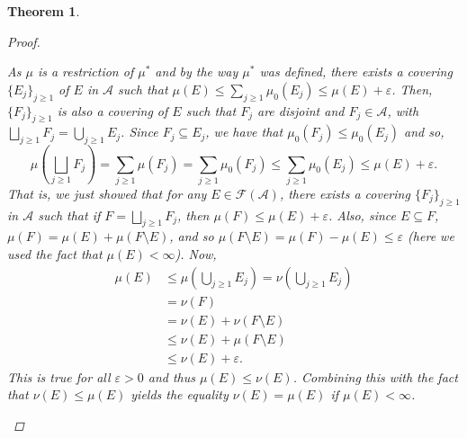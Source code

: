 \documentclass{article}
\newcommand{\A}{\mathscr{A}}
\newcommand{\F}{\mathscr{F}}
\theoremstyle{spaced}
\newtheorem{theorem}{Theorem}[section]
\begin{document}
\begin{theorem}
\begin{proof}
\begin{enumerate}
            As $\mu$ is a restriction of $\mu^*$ and by the way $\mu^*$ was defined, there exists a covering $\{E_j\}_{j \geq 1}$ of $E$ in $\A$ such that $\mu(E) \leq \sum_{j \geq 1} \mu_0(E_j) \leq \mu(E) + \varepsilon$. Then, $\{F_j\}_{j \geq 1}$ is also a covering of $E$ such that $F_j$ are disjoint and $F_j \in \A$, with $\bigsqcup_{j \geq 1} F_j = \bigcup _{j \geq1} E_j$. Since $F_j \subseteq E_j$, we have that $\mu_0(F_j) \leq \mu_0(E_j)$ and so, 
                \begin{equation*}
                    \mu \left( \bigsqcup_{j \geq 1} F_j \right) = \sum_{j \geq1} \mu(F_j) = \sum_{j \geq 1} \mu_0(F_j) \leq \sum_{j \geq 1} \mu_0(E_j) \leq \mu(E) + \varepsilon.
                \end{equation*}
            That is, we just showed that for any $E \in \F(\A)$, there exists a covering $\{F_j\}_{j \geq 1}$ in $\A$ such that if $F = \bigsqcup_{j \geq 1} F_j$, then $\mu(F) \leq \mu(E) + \varepsilon$. Also, since $E \subseteq F$, $\mu(F) = \mu(E) + \mu(F \setminus E)$, and so $\mu(F \setminus E) = \mu(F) - \mu(E) \leq \varepsilon$ (here we used the fact that $\mu(E) < \infty$). Now, 
            \begin{align*}
                \mu(E) &\leq \mu(\bigcup_{j \geq 1} E_j) = \nu(\bigcup_{j \geq 1} E_j) \tag{from (9)}\\
                &= \nu(F) \\
                &= \nu(E) + \nu(F \setminus E) \tag{as $\nu$ is a measure} \\
                &\leq \nu(E) + \mu(F \setminus E) \\
                &\leq \nu(E) + \varepsilon.  
            \end{align*}
            This is true for all $\varepsilon > 0$ and thus $\mu(E) \leq \nu(E)$. Combining this with the fact that $\nu(E) \leq \mu(E)$ yields the equality $\nu(E) = \mu(E)$ if $\mu(E) < \infty$.


\end{enumerate}
\end{proof}
\end{theorem}
\end{document}
